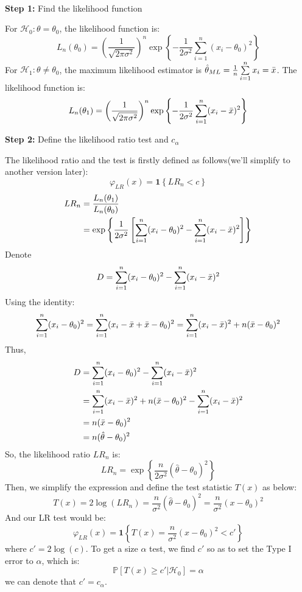 \documentclass[a4paper,12pt]{article} %
\theoremstyle{nonitalic}
\newenvironment{solution}[1]
  {\renewcommand\theinnercustomsol{#1}\innercustomsol}
  {\endinnercustomsol}
\newcounter{solutionctr}
\renewcommand{\thesolutionctr}{(\alph{solutionctr})}
\newenvironment{autosolution}
  {\stepcounter{solutionctr}\begin{solution}{\thesolutionctr}}
  {\end{solution}}
\begin{document}
\begin{autosolution}
    \ 

    \textbf{Step 1:} Find the likelihood function
    
    For $\mathcal{H}_0: \theta = \theta_0$, the likelihood function is:
    \[
    L_n(\theta_0) = \left(\frac{1}{\sqrt{2\pi\sigma^2}}\right)^n \exp{\left\{-\frac{1}{2\sigma^2} \sum_{i=1}^{n} (x_i - \theta_0)^2\right\}}
    \]
    For $\mathcal{H}_1: \theta \neq \theta_0$, the maximum likelihood estimator is $\hat{\theta}_{ML} = \frac{1}{n}\sum\limits_{i=1}^{n}x_i = \Bar{x}$. The likelihood function is:
    \[
    L_n(\theta_1) = \left(\frac{1}{\sqrt{2\pi\sigma^2}}\right)^n \exp{\left\{-\frac{1}{2\sigma^2} \sum_{i=1}^{n} (x_i - \Bar{x})^2\right\}}
    \]

    \textbf{Step 2:} Define the likelihood ratio test and $c_\alpha$

    The likelihood ratio and the test is firstly defined as follows(we'll simplify to another version later):
    \[
    \varphi_{LR}(x) = \mathbf{1}\left\{LR_n < c\right\}
    \]
    \begin{align*}
         LR_n &= \frac{L_n(\theta_1)}{L_n(\theta_0)} \\
              &= \exp{\left\{ \frac{1}{2\sigma^2}\left[\sum_{i=1}^{n} (x_i - \theta_0)^2 - \sum_{i=1}^{n} (x_i - \Bar{x})^2\right]\right\}}
    \end{align*}
    Denote 
    \[
    D = \sum\limits_{i=1}^{n} (x_i - \theta_0)^2 - \sum\limits_{i=1}^{n} (x_i - \Bar{x})^2
    \]
    Using the identity:
    \[
    \sum\limits_{i=1}^{n} (x_i - \theta_0)^2 = \sum\limits_{i=1}^{n} (x_i - \Bar{x} + \Bar{x} - \theta_0)^2 = \sum\limits_{i=1}^{n} (x_i - \Bar{x})^2 + n(\Bar{x} - \theta_0)^2
    \]
    Thus, 
    \begin{align*}
        D &= \sum\limits_{i=1}^{n} (x_i - \theta_0)^2 - \sum\limits_{i=1}^{n} (x_i - \Bar{x})^2 \\
          &= \sum\limits_{i=1}^{n} (x_i - \Bar{x})^2 + n(\Bar{x} - \theta_0)^2 - \sum\limits_{i=1}^{n} (x_i - \Bar{x})^2 \\
          &= n(\Bar{x} - \theta_0)^2 \\
          &= n(\hat{\theta} - \theta_0)^2
    \end{align*}
    So, the likelihood ratio $LR_n$ is:
    \[
    LR_n = \exp{\left\{\frac{n}{2\sigma^2} (\hat{\theta} - \theta_0)^2\right\}}
    \]
    Then, we simplify the expression and define the test statistic $T(x)$ as below:
    \[
    T(x) = 2\log{(LR_n)} = \frac{n}{\sigma^2}(\hat{\theta} - \theta_0)^2 = \frac{n}{\sigma^2}(x - \theta_0)^2
    \]
    And our LR test would be:
    \[
    \varphi_{LR}(x) = \mathbf{1}\left\{ T(x) = \frac{n}{\sigma^2}(x - \theta_0)^2 < c'\right\}
    \]
    where $c' = 2\log(c)$.
    To get a size $\alpha$ test, we find $c'$ so as to set the Type I error to $\alpha$, which is:
    \[
    \mathbb{P}\left[ T(x) \geq c' | \mathcal{H}_0\right] = \alpha
    \]
    we can denote that $c' = c_\alpha$.


\end{autosolution}
\end{document}
